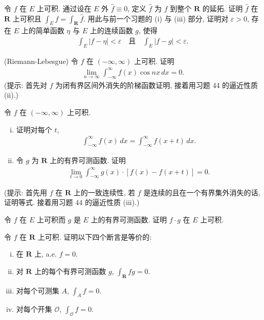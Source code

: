 \documentclass[../../main.tex]{subfiles}
\begin{document}
\begin{exercise}\label{exercise:ch04-45}
令 $f$ 在 $E$ 上可积. 通过设在 $E$ 外 $\hat{f}\equiv 0$, 定义 $\hat{f}$ 为 $f$ 到整个 $\mathbf{R}$ 的延拓. 证明 $\hat{f}$ 在 $\mathbf{R}$ 上可积且 $\int_{E}f=\int_{\mathbf{R}}\hat{f}$.
用此与前一个习题的 (i) 与 (iii) 部分, 证明对 $\varepsilon>0$, 存在 $E$ 上的简单函数 $\eta$ 与 $E$ 上的连续函数 $g$, 使得
\begin{align*}
\int_{E}|f-\eta|<\varepsilon\quad\text{且}\quad\int_{E}|f-g|<\varepsilon.
\end{align*}
\end{exercise}

\begin{exercise}\label{exercise:ch04-46}
(Riemann-Lebesgue) 令 $f$ 在 $(-\infty,\infty)$ 上可积. 证明
\begin{align*}
\lim_{n\to\infty}\int_{-\infty}^{\infty}f(x)\cos nx\,dx=0.
\end{align*}
(提示: 首先对 $f$ 为闭有界区间外消失的阶梯函数证明, 接着用习题 44 的逼近性质 (ii).)
\end{exercise}

\begin{exercise}\label{exercise:ch04-47}
令 $f$ 在 $(-\infty,\infty)$ 上可积.
\begin{enumerate}[(i)]
\item 证明对每个 $t$,
\begin{align*}
\int_{-\infty}^{\infty}f(x)\,dx=\int_{-\infty}^{\infty}f(x+t)\,dx.
\end{align*}
\item 令 $g$ 为 $\mathbf{R}$ 上的有界可测函数. 证明
\begin{align*}
\lim_{t\to 0}\int_{-\infty}^{\infty}g(x)\cdot[f(x)-f(x+t)]=0.
\end{align*}
\end{enumerate}
(提示: 首先用 $f$ 在 $\mathbf{R}$ 上的一致连续性, 若 $f$ 是连续的且在一个有界集外消失的话, 证明等式. 接着用习题 44 的逼近性质 (iii).)
\end{exercise}

\begin{exercise}\label{exercise:ch04-48}
令 $f$ 在 $E$ 上可积而 $g$ 是 $E$ 上的有界可测函数. 证明 $f\cdot g$ 在 $E$ 上可积.
\end{exercise}

\begin{exercise}\label{exercise:ch04-49}
令 $f$ 在 $\mathbf{R}$ 上可积. 证明以下四个断言是等价的:
\begin{enumerate}[(i)]
\item 在 $\mathbf{R}$ 上, a.e. $f=0$.
\item 对 $\mathbf{R}$ 上的每个有界可测函数 $g$, $\int_{\mathbf{R}}fg=0$.
\item 对每个可测集 $A$, $\int_{A}f=0$.
\item 对每个开集 $\mathcal{O}$, $\int_{\mathcal{O}}f=0$.
\end{enumerate}
\end{exercise}
\end{document}
